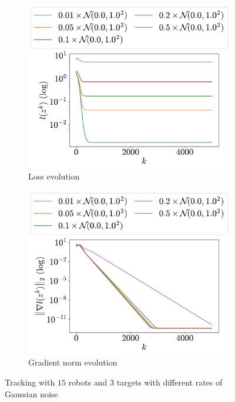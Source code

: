 \documentclass[a4paper,11pt,oneside]{book}
\begin{document}
\begin{figure}[H]
      \centering
      \begin{subfigure}[t]{0.46\linewidth}
            \centering
            \includegraphics[width=\linewidth]{./figs/tracking/rates/loss.pdf} 
            \caption{Loss evolution}
      \end{subfigure}
      \hfill
      \begin{subfigure}[t]{0.46\linewidth}
            \centering
            \includegraphics[width=\linewidth]{./figs/tracking/rates/gradient.pdf} 
            \caption{Gradient norm evolution}
      \end{subfigure}
      \caption{Tracking with $15$ robots and $3$ targets with different rates of Gaussian noise}
      \label{fig:tracking_rates_15_3}
\end{figure}
\end{document}
